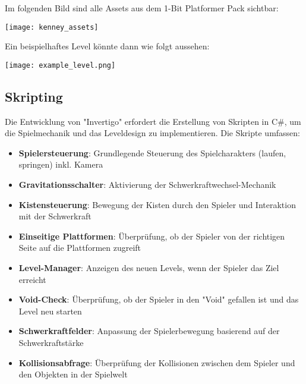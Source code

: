 \documentclass{article}
\begin{document}
Im folgenden Bild sind alle Assets aus dem 1-Bit Platformer Pack sichtbar:

\texttt{[image: kenney\_assets]}

Ein beispielhaftes Level könnte dann wie folgt aussehen:

\texttt{[image: example\_level.png]}

\subsection{Skripting}
Die Entwicklung von "Invertigo" erfordert die Erstellung von Skripten in C\#, um die Spielmechanik und das Leveldesign zu implementieren.
Die Skripte umfassen:
\begin{itemize}
    \item \textbf{Spielersteuerung}: Grundlegende Steuerung des Spielcharakters (laufen, springen) inkl. Kamera
    \item \textbf{Gravitationsschalter}: Aktivierung der Schwerkraftwechsel-Mechanik
    \item \textbf{Kistensteuerung}: Bewegung der Kisten durch den Spieler und Interaktion mit der Schwerkraft
    \item \textbf{Einseitige Plattformen}: Überprüfung, ob der Spieler von der richtigen Seite auf die Plattformen zugreift
    \item \textbf{Level-Manager}: Anzeigen des neuen Levels, wenn der Spieler das Ziel erreicht
    \item \textbf{Void-Check}: Überprüfung, ob der Spieler in den "Void" gefallen ist und das Level neu starten
    \item \textbf{Schwerkraftfelder}: Anpassung der Spielerbewegung basierend auf der Schwerkraftstärke
    \item \textbf{Kollisionsabfrage}: Überprüfung der Kollisionen zwischen dem Spieler und den Objekten in der Spielwelt
\end{itemize}
\end{document}
